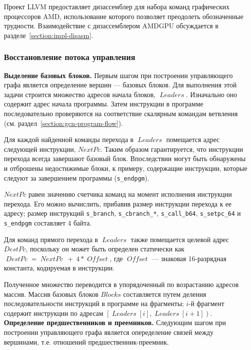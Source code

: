 \documentclass[a4paper,14pt]{extarticle}
\newcommand{\topic}[1]{\textbf{#1.}}
\newcommand{\var}[1]{\mathop{\mathit{#1}}}
\begin{document}
{Проект LLVM предоставляет дизассемблер для набора команд графических процессоров AMD,
использование которого позволяет преодолеть обозначенные трудности. Взаимодействие с
дизассемблером AMDGPU обсуждается в разделе~\ref{section:impl-disasm}.

\subsubsection{Восстановление потока управления}

\topic{Выделение базовых блоков} Первым шагом при построении управляющего графа
является определение вершин — базовых блоков. Для выполнения этой задачи
строится множество адресов начала блоков, $\var{Leaders}$. Изначально
оно содержит адрес начала программы. Затем инструкции в программе
последовательно проверяются на соответствие скалярным командам ветвления
(см. раздел~\ref{section:gcn-program-flow}).

Для каждой найденной команды перехода в $\var{Leaders}$ помещается адрес следующей инструкции,
$NextPc$. Таким образом гарантируется, что инструкции перехода всегда завершают базовый
блок. Впоследствии могут быть обнаружены и отброшены недостижимые блоки, к примеру,
содержащие инструкции, которые следуют за завершением программы (\verb|s_endpgm|).

$NextPc$ равен значению счетчика команд на момент исполнения инструкции перехода.
Его можно вычислить, прибавив размер инструкции перехода к ее адресу; размер инструкций
\verb|s_branch|, \verb|s_cbranch_*|, \verb|s_call_b64|, \verb|s_setpc_64|
и \verb|s_endpgm| составляет 4 байта.

Для команд прямого перехода в $\var{Leaders}$ также помещается целевой адрес $DestPc$,
поскольку он может быть определен статически как $\var{DestPc} = \var{NextPc}\ +\ 4*\var{Offset}$,
где $\var{Offset}$ — знаковая 16-разрядная константа, кодируемая в инструкции.

Полученное множество переводится в упорядоченный по возрастанию адресов массив.
Массив базовых блоков $Blocks$ составляется путем деления последовательности инструкций
в программе на фрагменты; $i$-й фрагмент содержит инструкции по адресам
$\left[\var{Leaders}[i], \var{Leaders}[i+1]\right)$.\\

\topic{Определение предшественников и преемников} Следующим шагом при построении
управляющего графа является опеределение связей между вершинами, т.е. отношений
предшественник-преемник.

}
\end{document}

